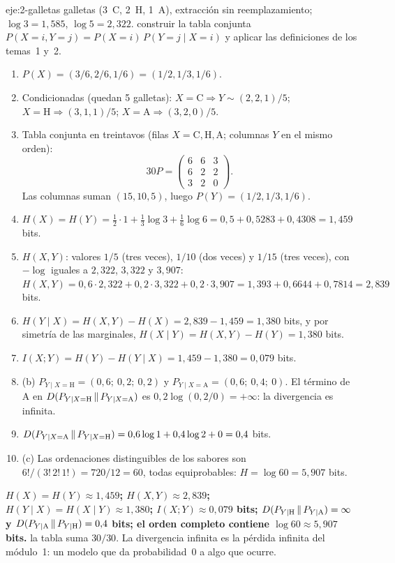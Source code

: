 \begin{solucion}{eje:2-galletas}
 galletas (3~C, 2~H, 1~A), extracción sin reemplazamiento; $\log 3=1{,}585$, $\log 5=2{,}322$.
\planteamiento construir la tabla conjunta $P(X=i,Y=j)=P(X=i)\,P(Y=j\mid X=i)$ y aplicar las definiciones de los temas~1 y~2.
\pasos
\begin{enumerate}[label=\arabic*.]
  \item $P(X)=(3/6,2/6,1/6)=(1/2,1/3,1/6)$.
  \item Condicionadas (quedan 5 galletas): $X=\mathrm{C}\Rightarrow Y\sim(2,2,1)/5$; $X=\mathrm{H}\Rightarrow(3,1,1)/5$; $X=\mathrm{A}\Rightarrow(3,2,0)/5$.
  \item Tabla conjunta en treintavos (filas $X=\mathrm{C},\mathrm{H},\mathrm{A}$; columnas $Y$ en el mismo orden):
  \[30P=\begin{pmatrix}6&6&3\\6&2&2\\3&2&0\end{pmatrix}.\]
  Las columnas suman $(15,10,5)$, luego $P(Y)=(1/2,1/3,1/6)$.
  \item $H(X)=H(Y)=\tfrac12\cdot 1+\tfrac13\log 3+\tfrac16\log 6=0{,}5+0{,}5283+0{,}4308=1{,}459$ bits.
  \item $H(X,Y)$: valores $1/5$ (tres veces), $1/10$ (dos veces) y $1/15$ (tres veces), con $-\log$ iguales a $2{,}322$, $3{,}322$ y $3{,}907$:
  $H(X,Y)=0{,}6\cdot 2{,}322+0{,}2\cdot 3{,}322+0{,}2\cdot 3{,}907=1{,}393+0{,}6644+0{,}7814=2{,}839$ bits.
  \item $H(Y\mid X)=H(X,Y)-H(X)=2{,}839-1{,}459=1{,}380$ bits, y por simetría de las marginales, $H(X\mid Y)=H(X,Y)-H(Y)=1{,}380$ bits.
  \item $I(X;Y)=H(Y)-H(Y\mid X)=1{,}459-1{,}380=0{,}079$ bits.
  \item (b) $P_{Y\mid X=\mathrm{H}}=(0{,}6;\ 0{,}2;\ 0{,}2)$ y $P_{Y\mid X=\mathrm{A}}=(0{,}6;\ 0{,}4;\ 0)$. El término de A en $D(P_{Y\mid X=\mathrm{H}}\,\|\,P_{Y\mid X=\mathrm{A}})$ es $0{,}2\log(0{,}2/0)=+\infty$: la divergencia es infinita.
  \item $D(P_{Y\mid X=\mathrm{A}}\,\|\,P_{Y\mid X=\mathrm{H}})=0{,}6\log 1+0{,}4\log 2+0=0{,}4$ bits.
  \item (c) Las ordenaciones distinguibles de los sabores son $6!/(3!\,2!\,1!)=720/12=60$, todas equiprobables: $H=\log 60=5{,}907$ bits.
\end{enumerate}
\resultado \textbf{$H(X)=H(Y)\approx 1{,}459$; $H(X,Y)\approx 2{,}839$; $H(Y\mid X)=H(X\mid Y)\approx 1{,}380$; $I(X;Y)\approx 0{,}079$ bits; $D(P_{Y\mid\mathrm{H}}\,\|\,P_{Y\mid\mathrm{A}})=\infty$ y $D(P_{Y\mid\mathrm{A}}\,\|\,P_{Y\mid\mathrm{H}})=0{,}4$ bits; el orden completo contiene $\log 60\approx 5{,}907$ bits.}
\comprobacion la tabla suma $30/30$. La divergencia infinita es la pérdida infinita del módulo~1: un modelo que da probabilidad~0 a algo que ocurre.
\end{solucion}

